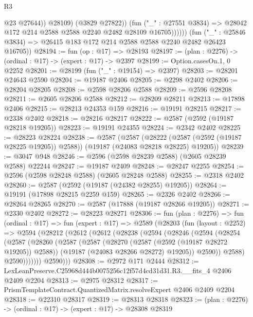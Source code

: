\begin{lexlean}{R3}
\begin{coremodule}
                        @23
                        @27644))
                    @28109)
                  (@3829 @27822))
                (fun ("_" : @27551 @3834) =>
                @28042 @172 @214 @2588 @2588 @2240 @2482 @28109 @16705))))))
      (fun ("_" : @25846 @3834) => @26415 @183 @172 @214 @2588 @2588 @2240 @2482 @26423 @16705))
@28194 := fun (op : @17) => @28193
@28197 := (plan : @2276) -> (ordinal : @17) -> (expert : @17) -> @2397
@28199 := Option.casesOn.{1, 0} @2252
@28201 := @28199 (fun ("_" : @19154) => @2397)
@28203 := @28201 @24643 @2590
@28204 := @19187 @2406
@28205 := @2298 @2402
@28206 := @28204 @28205
@28208 := @2598 @28206 @2588
@28209 := @2596 @28208
@28211 := @2605 @28206 @2588
@28212 := @28209 @28211
@28213 := @17898 @2406
@28215 := @28213 @24353 @159
@28216 := @19191 @28215
@28217 := @2338 @2402
@28218 := @28216 @28217
@28222 := @2587 (@2592 (@19187 @28218 @19205))
@28223 := @19191 @24355
@28224 := @2342 @2402
@28225 := @28223 @28224
@28238 := @2587
    (@2587
      (@28222 (@2587 (@2592 (@19187 @28225 @19205)) @2588))
      (@19187 (@24083 @28218 @28225) @19205))
@28239 := @3047 @948
@28246 := @2596 (@2598 @28239 @2588) (@2605 @28239 @2588) @22244
@28247 := @19187 @2409
@28248 := @28247 @2255
@28254 := @2596 (@2598 @28248 @2588) (@2605 @28248 @2588)
@28255 := @2318 @2402
@28260 := @2587 (@2592 (@19187 (@24382 @28255) @19205))
@28264 := @19191 (@17898 @28215 @2259 @159)
@28265 := @2326 @2402
@28266 := @28264 @28265
@28270 := @2587 (@17888 (@19187 @28266 @19205))
@28271 := @2330 @2402
@28272 := @28223 @28271
@28306 := fun (plan : @2276) =>
  fun (ordinal : @17) =>
  fun (expert : @17) =>
  @2589
    (@28203
      (fun (layout : @2252) =>
      @2594
        (@28212
          (@2612
            (@2612
              (@28238
                (@2594
                  (@28246
                    (@2594
                      (@28254
                        (@2587
                          (@28260
                            (@2587
                              (@2587
                                (@28270 (@2587 (@2592 (@19187 @28272 @19205)) @2588))
                                (@19187 (@24083 @28266 @28272) @19205))
                              @2590))
                          @2588)
                        @2590)))))))
          @2590)))
@28308 := @2972 @171 @2444
@28312 := LexLeanPreserve.C25968d444b0075256c12f57d4cd31d31.R3.__fits_4 @2406 @2409 @2204
@28313 := @2975 @28312
@28317 := PrismTemplateContract.QuantizedMatrix.resolveExpert @2406 @2409 @2204
@28318 := @22310 @28317
@28319 := @28313 @28318
@28323 := (plan : @2276) -> (ordinal : @17) -> (expert : @17) -> @28308 @28319

\end{coremodule}
\end{lexlean}
